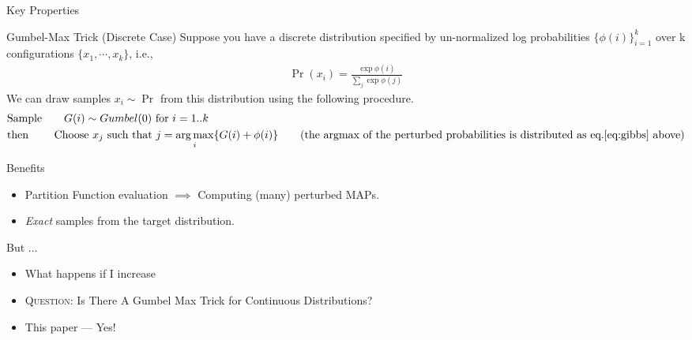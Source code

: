 \begin{frame}{Key Properties}
\end{frame}

\begin{frame}{Gumbel-Max Trick (Discrete Case)}
  Suppose you have a discrete distribution specified by un-normalized log probabilities $\{\phi(i)\}_{i=1}^{k}$ over k configurations $\{x_1,\cdots,x_k\}$, i.e.,
  \begin{align}
    \Pr(x_i) = \frac{\exp\phi(i)}{\sum_j\exp\phi(j)} \label{eq:gibbs}
  \end{align}
  We can draw samples $x_i \sim \Pr$ from this distribution using the following procedure.
  \begin{align*}
    & \text{Sample} \qquad G(i) \sim Gumbel(0) \text{ for } i=1..k\\
    & \text{then} \qquad \text{ Choose } x_j \text{ such that } j= \argmax_i \{G(i) +\phi(i)\} \tag{the argmax of the perturbed probabilities is distributed as eq.\ref{eq:gibbs} above}
  \end{align*}

\end{frame}

\begin{frame}{Benefits} %
  \begin{itemize}
  \item Partition Function evaluation $\implies$ Computing (many) perturbed MAPs. %
  \item \emph{Exact} samples from the target distribution. %
  \end{itemize}
  But ...
  \begin{itemize}
  \item What happens if I increase 
  \item \textsc{Question:} Is There A Gumbel Max Trick for Continuous Distributions? %
    \pause
  \item {\color{red} This paper --- Yes!}
  \end{itemize}
\end{frame}

